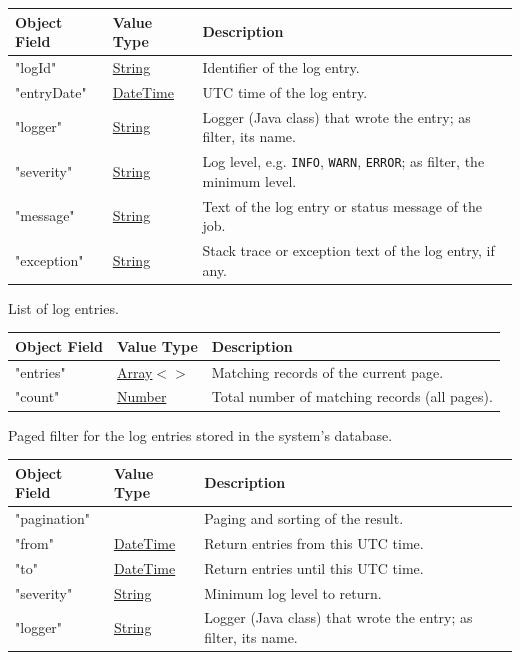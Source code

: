 \documentclass[a4paper]{arrowhead}
\newcommand{\mref}[2][]{{\textcolor{ArrowheadPurple}{\hyperref[sec:model:#2]{\ifstrempty{#1}{#2}{#1}}}}}
\newcommand{\pref}[1]{{\textcolor{ArrowheadGrey}{\hyperref[sec:model:primitives:#1]{#1}}}}
\begin{document}
\noindent\begin{tabularx}{\textwidth}{| >{\raggedright\arraybackslash}p{3.9cm} | >{\raggedright\arraybackslash\small}p{5.3cm} | X |} \hline
\rowcolor{gray!33} Object Field & Value Type & Description \\ \hline
"log\allowbreak{}Id" & \pref{String} & Identifier of the log entry. \\ \hline
"entry\allowbreak{}Date" & \pref{DateTime} & UTC time of the log entry. \\ \hline
"logger" & \pref{String} & Logger (Java class) that wrote the entry; as filter, its name. \\ \hline
"severity" & \pref{String} & Log level, e.g. \texttt{INFO}, \texttt{WARN}, \texttt{ERROR}; as filter, the minimum level. \\ \hline
"message" & \pref{String} & Text of the log entry or status message of the job. \\ \hline
"exception" & \pref{String} & Stack trace or exception text of the log entry, if any. \\ \hline
\end{tabularx}




List of log entries.


\noindent\begin{tabularx}{\textwidth}{| >{\raggedright\arraybackslash}p{3.9cm} | >{\raggedright\arraybackslash\small}p{5.3cm} | X |} \hline
\rowcolor{gray!33} Object Field & Value Type & Description \\ \hline
"entries" & \pref{Array}$<$\allowbreak{}\mref{LogEntry}$>$ & Matching records of the current page. \\ \hline
"count" & \pref{Number} & Total number of matching records (all pages). \\ \hline
\end{tabularx}




Paged filter for the log entries stored in the system's database.


\noindent\begin{tabularx}{\textwidth}{| >{\raggedright\arraybackslash}p{3.9cm} | >{\raggedright\arraybackslash\small}p{5.3cm} | X |} \hline
\rowcolor{gray!33} Object Field & Value Type & Description \\ \hline
"pagination" & \mref{Page} & Paging and sorting of the result. \\ \hline
"from" & \pref{DateTime} & Return entries from this UTC time. \\ \hline
"to" & \pref{DateTime} & Return entries until this UTC time. \\ \hline
"severity" & \pref{String} & Minimum log level to return. \\ \hline
"logger" & \pref{String} & Logger (Java class) that wrote the entry; as filter, its name. \\ \hline
\end{tabularx}
\end{document}
